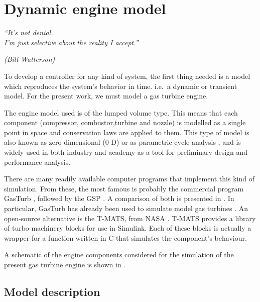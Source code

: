 \documentclass[tcc]{subfiles}
\begin{document}
\chapter{Dynamic engine model}
\label{ch:engine_model}
\epigraph{\em ``It's not denial.\\ I'm just selective about the reality I
accept.''}{\em(Bill Watterson)}

To develop a controller for any kind of system,
 the first thing needed is a model which reproduces the system's behavior in time.
 i.e.\ a dynamic or transient model.
 For the present work, we must model a gas turbine engine.

The engine model used is of the lumped volume type. This means that each component 
 (compressor, combustor,turbine and nozzle)
 is modelled as a single point in space and conservation laws are applied to them.
 This type of model is also known as zero dimensional (0-D) or as parametric cycle analysis
 ,
 and is widely used in both industry and academy as a tool for preliminary design and 
 performance analysis. 

There are many readily available computer programs that implement this kind of simulation. 
From these, the most famous is probably the commercial program GasTurb \cite{GasTurb}, 
 
followed by the \gls{GSP} \cite{Visser2000}.
A comparison of both is presented in \textcite{GasTurbvsGSP}.
In particular, GasTurb has already been used to simulate model gas turbines 
 \cite{gao2011modelling}.
An open-source alternative is the \gls{T-MATS}, from NASA \cite{T-MATS}.
\gls{T-MATS} provides a library of turbo machinery blocks for use in Simulink. 
Each of these blocks is actually a wrapper for a function written in C 
 that simulates the component's behaviour.

A schematic of the engine components considered for the simulation of the present gas turbine engine is shown in .

\section{Model description}
\end{document}
